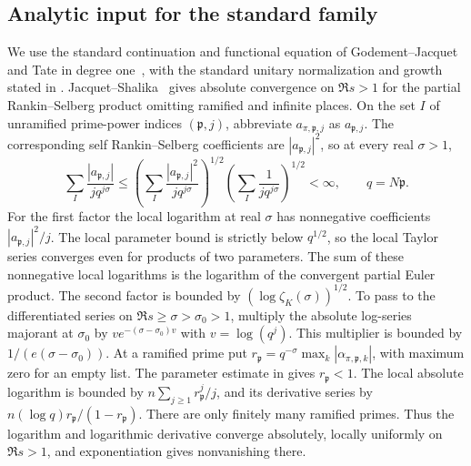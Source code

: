 \documentclass[11pt]{amsart}
\theoremstyle{definition}
\theoremstyle{remark}
\numberwithin{equation}{section}
\begin{document}
\subsection{Analytic input for the standard family}

We use the standard continuation and functional equation of
Godement--Jacquet~\cite[Theorem 13.8]{GodementJacquet1972}
and Tate in degree one~\cite{Tate1967}, with the standard
unitary normalization and growth stated in
\cite[\S\,2.1]{ThornerZhaoRankinSelberg}.
Jacquet--Shalika~\cite[Part I, Theorem 5.3]{JacquetShalika1981}
gives absolute convergence on \(\Re s>1\) for the partial
Rankin--Selberg product omitting ramified and infinite places. On the set \(I\) of unramified prime-power
indices \((\mathfrak p,j)\), abbreviate \(a_{\pi,\mathfrak p,j}\)
as \(a_{\mathfrak p,j}\).
The corresponding self Rankin--Selberg coefficients are
\(|a_{\mathfrak p,j}|^2\), so at every real \(\sigma>1\),
\[
 \sum_I\frac{|a_{\mathfrak p,j}|}{j q^{j\sigma}}
 \leq
 \left(\sum_I\frac{|a_{\mathfrak p,j}|^2}{j q^{j\sigma}}\right)^{1/2}
 \left(\sum_I\frac{1}{j q^{j\sigma}}\right)^{1/2}<\infty,
 \qquad q=N\mathfrak p.
\]
For the first factor the local logarithm at real \(\sigma\)
has nonnegative coefficients \(|a_{\mathfrak p,j}|^2/j\).
The local parameter bound \cite[(2.2)]{ThornerZhaoRankinSelberg}
is strictly below \(q^{1/2}\), so the local Taylor
series converges even for products of two parameters.
The sum of these nonnegative local logarithms is the
logarithm of the convergent partial Euler product.
The second factor is bounded by \((\log\zeta_K(\sigma))^{1/2}\).
To pass to the differentiated series on
\(\Re s\geq\sigma>\sigma_0>1\), multiply the absolute
log-series majorant at \(\sigma_0\) by
\(v e^{-(\sigma-\sigma_0)v}\) with \(v=\log(q^j)\).
This multiplier is bounded by \(1/(e(\sigma-\sigma_0))\).
At a ramified prime put \(r_{\mathfrak p}=q^{-\sigma}
\max_k|\alpha_{\pi,\mathfrak p,k}|\), with maximum zero for an
empty list. The parameter estimate in
\cite[(2.2)]{ThornerZhaoRankinSelberg} gives \(r_{\mathfrak p}<1\).
The local absolute logarithm is bounded by
\(n\sum_{j\geq1}r_{\mathfrak p}^j/j\), and its derivative series
by \(n(\log q)r_{\mathfrak p}/(1-r_{\mathfrak p})\).
There are only finitely many ramified primes. Thus the logarithm
and logarithmic derivative converge absolutely, locally uniformly
on \(\Re s>1\), and exponentiation gives nonvanishing there.
\end{document}
